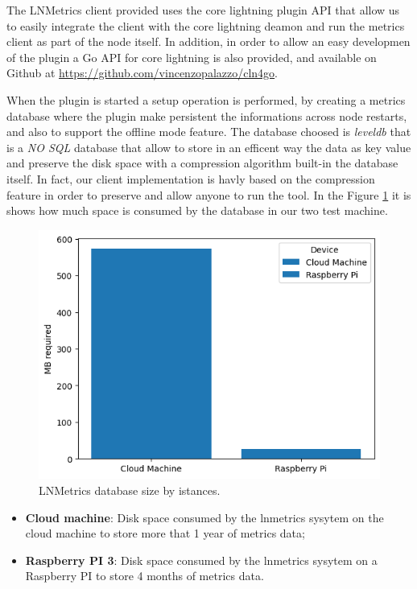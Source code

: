 The LNMetrics client provided uses the core lightning plugin API
that allow us to easily integrate the client with the core lightning deamon 
and run the metrics client as part of the node itself. 
In addition, in order to allow an easy developmen of the plugin a 
Go API for core lightning is also provided, and available on 
Github at \url{https://github.com/vincenzopalazzo/cln4go}.

When the plugin is started a setup operation is performed, by creating a 
metrics database where the plugin make persistent the informations 
across node restarts, and also to support the offline mode feature. 
The database choosed is \emph{leveldb} that is a \emph{NO SQL} database 
that allow to store in an efficent way the data as key value and preserve
the disk space with a compression algorithm built-in the database itself.
In fact, our client implementation is havly based on the 
compression feature in order to preserve and allow anyone to 
run the tool. 
In the Figure \ref{fig:lnmetrics_diskspace} it is shows how much space is 
consumed by the database in our two test machine. 

\begin{figure}
    \begin{center}
    \includegraphics[scale=0.7]{imgs/disk_space_servers.png}
    \end{center}
    \caption{LNMetrics database size by istances.}
    \label{fig:lnmetrics_diskspace}
\end{figure}

\begin{itemize}
    \item {\bf Cloud machine}: Disk space consumed by the lnmetrics 
        sysytem on the cloud machine to store more that 1 year of metrics data;
    \item {\bf Raspberry PI 3}: Disk space consumed by the lnmetrics sysytem
        on a Raspberry PI to store 4 months of metrics data.
\end{itemize}

